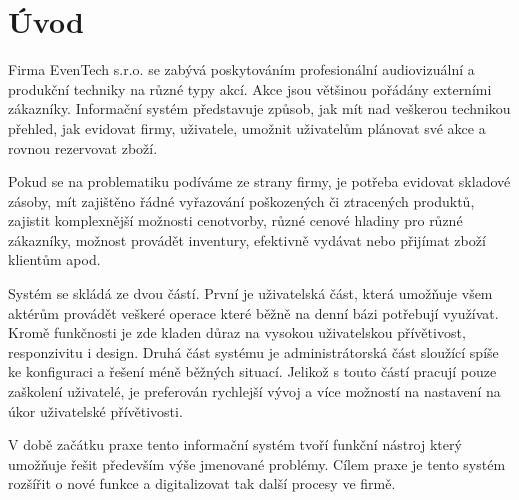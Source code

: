 \chapter{Úvod}
\label{sec:Introduction}

Firma EvenTech s.r.o. se  zabývá poskytováním profesionální audiovizuální a produkční techniky na různé typy akcí. Akce jsou většinou pořádány externími zákazníky. Informační systém představuje způsob, jak mít nad veškerou technikou přehled, jak evidovat firmy, uživatele, umožnit uživatelům plánovat své akce a rovnou rezervovat zboží.

Pokud se na problematiku podíváme ze strany firmy, je  potřeba evidovat skladové zásoby, mít zajištěno řádné vyřazování poškozených či ztracených produktů, zajistit komplexnější možnosti cenotvorby, různé cenové hladiny pro různé zákazníky, možnost provádět inventury, efektivně vydávat nebo přijímat zboží klientům apod.

Systém se skládá ze dvou částí. První je uživatelská část, která umožňuje všem aktérům provádět veškeré operace které běžně na denní bázi potřebují využívat. Kromě funkčnosti je zde kladen důraz na vysokou uživatelskou přívětivost, responzivitu i design. Druhá část systému je administrátorská část sloužící spíše ke konfiguraci a řešení méně běžných situací. Jelikož s touto částí pracují pouze zaškolení uživatelé, je preferován rychlejší vývoj a více možností na nastavení na úkor uživatelské přívětivosti. 

V době začátku praxe tento informační systém tvoří funkční nástroj který umožňuje řešit především výše jmenované problémy. Cílem praxe je tento systém rozšířit o nové funkce a digitalizovat tak další procesy ve firmě.